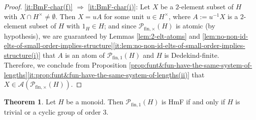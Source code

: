 \documentclass{report}
\newcommand{\fin}{\textrm{fin}}
\newcommand{\funt}{{\textrm{fin}, \times}}
\newcommand{\fun}{{\textrm{fin}, 1}}
\renewcommand{\:}{\text{:}}
\theoremstyle{definition}
\newtheorem{thm}[defn]{Theorem}
\begin{document}
\begin{proof}
	
	
	\ref{it:BmF-char(f)} $\Rightarrow$ \ref{it:BmF-char(i)}: Let $X$ be a $2$-element subset of $H$ with $X \cap H^\times \ne \emptyset$. Then $X = uA$ for some unit $u \in H^\times$, where $A := u^{-1}X$ is a $2$-element subset of $H$ with $1_H \in H$; and since $\mathcal P_{\fin,\times}(H)$ is atomic (by hypothesis), we are guaranteed by Lemmas \ref{lem:2-elt-atoms} and \ref{lem:no-non-id-elts-of-small-order-implies-structure}\ref{it:lem:no-non-id-elts-of-small-order-implies-structure(i)} that $A$ is an atom of $\mathcal P_\fun(H)$ and $H$ is Dedekind-finite. Therefore, we conclude from Proposition \ref{prop:funt&fun-have-the-same-system-of-lengths}\ref{it:prop:funt&fun-have-the-same-system-of-lengths(ii)} that $X \in \mathscr A(\mathcal P_\funt(H))$.
\end{proof}

\begin{thm}\label{prop:HF-exp-3}
	Let $H$ be a monoid. Then $\mathcal P_\fun(H)$ is \textup{HmF} if and only if $H$ is trivial or a cyclic group of order $3$.
\end{thm}
\end{document}
